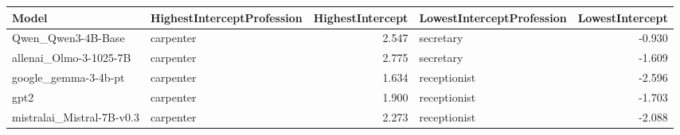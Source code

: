 \begin{tabular}{llrlr}
\toprule
Model & HighestInterceptProfession & HighestIntercept & LowestInterceptProfession & LowestIntercept \\
\midrule
Qwen_Qwen3-4B-Base & carpenter & 2.547 & secretary & -0.930 \\
allenai_Olmo-3-1025-7B & carpenter & 2.775 & secretary & -1.609 \\
google_gemma-3-4b-pt & carpenter & 1.634 & receptionist & -2.596 \\
gpt2 & carpenter & 1.900 & receptionist & -1.703 \\
mistralai_Mistral-7B-v0.3 & carpenter & 2.273 & receptionist & -2.088 \\
\bottomrule
\end{tabular}
